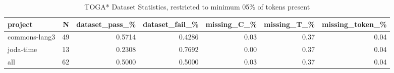 \begin{table*}
\centering
\caption{TOGA* Dataset Statistics, restricted to minimum 05\% of tokens present}
\label{tab:toga_stats_05}
\begin{tabular}{lrrrrrr}
\toprule
       project &   N &  dataset\_pass\_\% &  dataset\_fail\_\% &  missing\_C\_\% &  missing\_T\_\% &  missing\_token\_\% \\
\midrule
 commons-lang3 &  49 &          0.5714 &          0.4286 &         0.03 &         0.37 &             0.04 \\
     joda-time &  13 &          0.2308 &          0.7692 &         0.00 &         0.37 &             0.04 \\
           all &  62 &          0.5000 &          0.5000 &         0.03 &         0.37 &             0.04 \\
\bottomrule
\end{tabular}
\end{table*}
